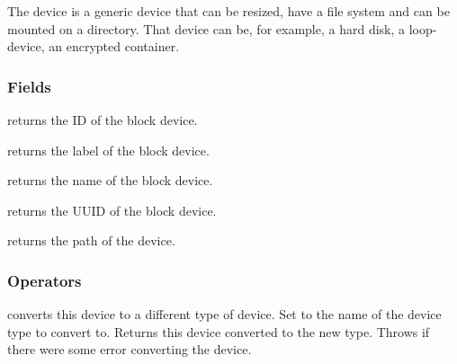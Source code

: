 %


The  device is a generic device that can be resized, have a file system 
and can be mounted on a directory. That device can be, for example, a hard disk,
a loop-device, an encrypted container.

\subsubsection*{Fields}

 returns the ID of the block device.

 returns the label of the block device.

 returns the name of the block device.

 returns the UUID of the block device.

 returns the path of the device.

\subsubsection*{Operators}

 converts this device to a different type of device.
Set  to the name of the device type to convert to.
Returns this device converted to the new type.
Throws  if there were some error converting the device.

